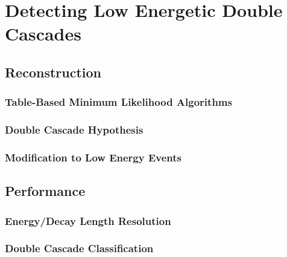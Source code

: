 \setchapterpreamble[u]{\margintoc}

\chapter{Detecting Low Energetic Double Cascades}


\section{Reconstruction}

\subsection{Table-Based Minimum Likelihood Algorithms}

\subsection{Double Cascade Hypothesis}

\subsection{Modification to Low Energy Events}


\section{Performance}

\subsection{Energy/Decay Length Resolution}

\subsection{Double Cascade Classification}
